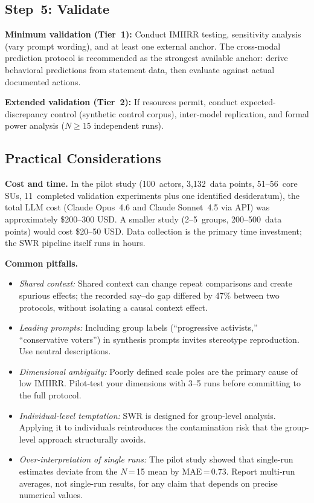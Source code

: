 \documentclass[11pt,a4paper]{article}
\begin{document}
\subsection{Step~5: Validate}
\label{sec:app:step5}

\textbf{Minimum validation (Tier~1):} Conduct IMIIRR testing, sensitivity analysis (vary prompt wording), and at least one external anchor. The cross-modal prediction protocol is recommended as the strongest available anchor: derive behavioral predictions from statement data, then evaluate against actual documented actions.

\textbf{Extended validation (Tier~2):} If resources permit, conduct expected-discrepancy control (synthetic control corpus), inter-model replication, and formal power analysis ($N \geq 15$ independent runs).


\subsection{Practical Considerations}
\label{sec:app:practical}

\textbf{Cost and time.} In the pilot study (100~actors, 3,132~data points, 51--56~core SUs, 11~completed validation experiments plus one identified desideratum), the total LLM cost (Claude Opus~4.6 and Claude Sonnet~4.5 via API) was approximately \$200--300 USD. A smaller study (2--5~groups, 200--500~data points) would cost \$20--50 USD. Data collection is the primary time investment; the SWR pipeline itself runs in hours.

\textbf{Common pitfalls.}
\begin{itemize}[nosep]
  \item \emph{Shared context:} Shared context can change repeat comparisons and create spurious effects; the recorded say--do gap differed by 47\% between two protocols, without isolating a causal context effect.
  \item \emph{Leading prompts:} Including group labels (``progressive activists,'' ``conservative voters'') in synthesis prompts invites stereotype reproduction. Use neutral descriptions.
  \item \emph{Dimensional ambiguity:} Poorly defined scale poles are the primary cause of low IMIIRR. Pilot-test your dimensions with 3--5 runs before committing to the full protocol.
  \item \emph{Individual-level temptation:} SWR is designed for group-level analysis. Applying it to individuals reintroduces the contamination risk that the group-level approach structurally avoids.
  \item \emph{Over-interpretation of single runs:} The pilot study showed that single-run estimates deviate from the $N$\,=\,15 mean by MAE\,=\,0.73. Report multi-run averages, not single-run results, for any claim that depends on precise numerical values.
\end{itemize}
\end{document}
